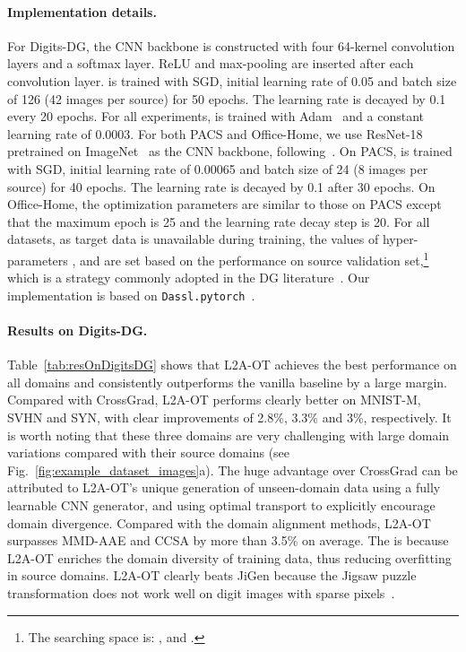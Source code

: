 \documentclass[runningheads]{llncs}
\begin{document}
\paragraph{Implementation details.}
For Digits-DG, the CNN backbone is constructed with four 64-kernel  convolution layers and a softmax layer. ReLU and  max-pooling are inserted after each convolution layer.  is trained with SGD, initial learning rate of 0.05 and batch size of 126 (42 images per source) for 50 epochs. The learning rate is decayed by 0.1 every 20 epochs. For all experiments,  is trained with Adam~\cite{kingma2014adam} and a constant learning rate of 0.0003. For both PACS and Office-Home, we use ResNet-18~\cite{he2016deep} pretrained on ImageNet~\cite{deng2009imagenet} as the CNN backbone, following~\cite{d2018domain,cvpr19JiGen,li2019episodic}. On PACS,  is trained with SGD, initial learning rate of 0.00065 and batch size of 24 (8 images per source) for 40 epochs. The learning rate is decayed by 0.1 after 30 epochs. On Office-Home, the optimization parameters are similar to those on PACS except that the maximum epoch is 25 and the learning rate decay step is 20. For all datasets, as target data is unavailable during training, the values of hyper-parameters ,  and  are set based on the performance on source validation set,\footnote{The searching space is: ,  and .} which is a strategy commonly adopted in the DG literature~\cite{cvpr19JiGen,li2019episodic}. Our implementation is based on \texttt{Dassl.pytorch}~\cite{zhou2020domain}. 

\paragraph{Results on Digits-DG.}
Table~\ref{tab:resOnDigitsDG} shows that L2A-OT achieves the best performance on all domains and consistently outperforms the vanilla baseline by a large margin. Compared with CrossGrad, L2A-OT performs clearly better on MNIST-M, SVHN and SYN, with clear improvements of 2.8\%, 3.3\% and 3\%, respectively. It is worth noting that these three domains are very challenging with large domain variations compared with their source domains (see Fig.~\ref{fig:example_dataset_images}a). The huge advantage over CrossGrad can be attributed to L2A-OT's unique generation of unseen-domain data using a fully learnable CNN generator, and using optimal transport to explicitly encourage domain divergence. Compared with the domain alignment methods, L2A-OT surpasses MMD-AAE and CCSA by more than 3.5\% on average. The is because L2A-OT enriches the domain diversity of training data, thus reducing overfitting in source domains. L2A-OT clearly beats JiGen because the Jigsaw puzzle transformation does not work well on digit images with sparse pixels~\cite{jigsaw_puzzles}.
\end{document}
